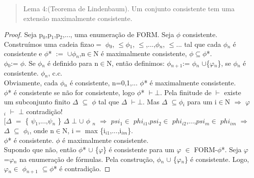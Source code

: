 \documentclass[12pt]{report}
\begin{document}
\begin{quote}
Lema 4:(Teorema de Lindenbaum). Um conjunto consistente tem uma extensão maximalmente consistente.
\end{quote}

\begin{proof}
Seja p$_{0}$,p$_{1}$,p$_{2}$,..., uma enumeração de FORM. Seja $\phi$ consistente. Construímos  uma cadeia fizao$=$ $\phi$$_{0}$, $\leq$$\phi$$_{1}$, $\leq$,...,$\phi$$_{n}$, $\leq$... tal que cada $\phi$$_{n}$ é consistente e $\phi$* $:=$ $\cup$$\phi$$_{n}$,n$\in$N é maximalmente consistente, $\phi$$\subseteq$$\phi$*.\\
$\phi$$_{0}$:= $\phi$. Se $\phi$$_{n}$ é definido para n$\in$N, então definimos: $\phi$$_{n+1}$:= $\phi$$_{n}$ $\cup$\{$\varphi$$_{n}$\}, se $\phi$$_{n}$ é consistente. $\phi$$_{n}$, c.c.\\
Obviamente, cada $\phi$$_{n}$ é consistente, n=0,1,... $\phi$* é maximalmente consistente.\\
$\phi$* é consistente se não for consistente, logo $\phi$* $\vdash$$\bot$. Pela finitude de $\vdash$ existe um subconjunto finito $\Delta$ $\subseteq$ $\phi$ tal que $\Delta$ $\vdash$$\bot$. Mas $\Delta$ $\subseteq$$\phi$$_{i}$ para um i$\in$N $\Longrightarrow$ $\varphi$$_{i}$ $\vdash$ $\bot$ contradição!\\
$[$$\Delta$ $=$ \{ $\psi$$_{1}$,...,$\psi$$_{n}$ \} $\Delta$ $\bot$ $\cup$ $\phi$ $_{n}$ $\Longrightarrow$ $psi$$_{1}$$\in$ $phi$$_{i1}$,$psi$$_{2}$$\in$ $phi$$_{i2}$,...,$psi$$_{m}$$\in$ $phi$$_{im}$ $\Longrightarrow$ $\Delta$ $\subseteq$ $\phi$$_{i}$, onde n$\in$N, i$=$ max \{i$_{i1}$,...,i$_{im}$\}.\\
$\phi$* é consistente. $\phi$ é maximalmente consistente.\\
Supondo que não, então $\phi$* $\cup$ \{$\varphi$\} é consistente para um $\varphi$ $\in$ FORM-$\phi$*. Seja $\varphi$=$\varphi$$_{n}$ na enumeração de fórmulas. Pela construção, $\phi$$_{n}$ $\cup$ \{$\varphi$$_{n}$\} é consistente. Logo, $\varphi$$_{n}$$\in$ $\phi$$_{n+1}$ $\subseteq$$\phi$* é contradição.
\end{proof}
	
\end{document}
